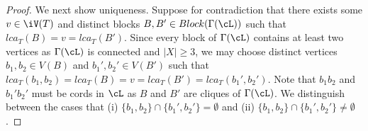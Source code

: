 \begin{proof}
  We next show uniqueness.  Suppose for contradiction that there exists some
  $v\in \iV(T)$ and distinct blocks $B,B'\in Block(\Gamma(\cL))$ such that
  $lca_T(B)=v=lca_T(B')$.
  Since every block of $\Gamma(\cL)$ contains at least two vertices as
  $\Gamma(\cL)$ is connected and $|X|\geq 3$, we may choose distinct vertices
  $b_1,b_2\in V(B)$ and $b_1',b_2'\in V(B')$ such that
  $lca_T(b_1,b_2)=lca_T(B)=v=lca_T(B')=lca_T(b_1',b_2')$.  Note that $b_1b_2$
  and $b_1'b_2' $ must be cords in $\cL$ as $B$ and $B'$ are cliques of
  $\Gamma(\cL)$.  We distinguish between the cases that (i)
  $\{b_1,b_2\}\cap\{b_1',b_2'\}=\emptyset $ and (ii)
  $\{b_1,b_2\}\cap\{b_1',b_2'\}\not=\emptyset $.


\end{proof}
